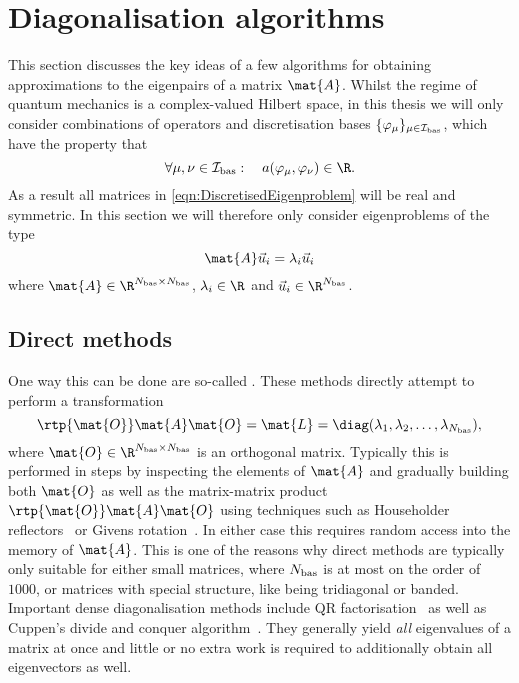 \section{Diagonalisation algorithms}
\label{sec:DiagAlgos}

This section discusses the key ideas of a few algorithms for obtaining
approximations to the eigenpairs of a matrix $\mat{A}$.
Whilst the regime of quantum mechanics is a complex-valued Hilbert space,
in this thesis
we will only consider combinations of operators and discretisation bases
$\{\varphi_\mu\}_{\mu \in \mathcal{I}_\text{bas}}$,
which have the property that
\[ \forall \mu, \nu \in \Ibas: \quad a(\varphi_\mu, \varphi_\nu) \in \R. \]
As a result all matrices in \eqref{eqn:DiscretisedEigenproblem} will be real and symmetric.
In this section we will therefore only consider eigenproblems of the type
\[ \mat{A} \vec{u}_i = \lambda_i \vec{u}_i \]
where $\mat{A} \in \R^{\Nbas \times \Nbas}$,
$\lambda_i \in \R$ and $\vec{u}_i \in \R^{\Nbas}$.

\subsection{Direct methods}
One way this can be done are so-called .
These methods directly attempt to perform a transformation
\[ \rtp{\mat{O}} \mat{A} \mat{O} = \mat{L} = \diag(\lambda_1, \lambda_2, \ldots, \lambda_{\Nbas}), \]
where $\mat{O} \in \R^{\Nbas\times\Nbas}$ is an orthogonal matrix.
Typically this is performed in steps by inspecting the elements of $\mat{A}$
and gradually building both $\mat{O}$ as well as the matrix-matrix product
$\rtp{\mat{O}} \mat{A} \mat{O}$
using techniques such as Householder reflectors~\cite{Arbenz2010}
or Givens rotation~\cite{Arbenz2010}.
In either case this requires random access into the memory of $\mat{A}$.
This is one of the reasons why
direct methods are typically only suitable for either small matrices,
where $N_\text{bas}$ is at most on the order of $1000$,
or matrices with special structure,
like being tridiagonal or banded.
Important dense diagonalisation methods include
QR factorisation~\cite{Arbenz2010,Saad2003}
as well as Cuppen's divide and conquer algorithm~\cite{Arbenz2010,Saad2003}.
They generally yield \emph{all} eigenvalues of a matrix at once
and little or no
extra work is required to additionally obtain all eigenvectors as well.

